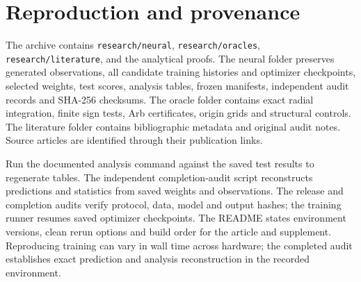 \documentclass[10 pt,a 4 paper]{article}
\begin{document}
\section{Reproduction and provenance}
The archive contains \texttt{research/neural}, \texttt{research/oracles}, \texttt{research/literature}, and the analytical proofs. The neural folder preserves generated observations, all candidate training histories and optimizer checkpoints, selected weights, test scores, analysis tables, frozen manifests, independent audit records and SHA-256 checksums. The oracle folder contains exact radial integration, finite sign tests, Arb certificates, origin grids and structural controls. The literature folder contains bibliographic metadata and original audit notes. Source articles are identified through their publication links.

Run the documented analysis command against the saved test results to regenerate tables. The independent completion-audit script reconstructs predictions and statistics from saved weights and observations. The release and completion audits verify protocol, data, model and output hashes; the training runner resumes saved optimizer checkpoints. The README states environment versions, clean rerun options and build order for the article and supplement. Reproducing training can vary in wall time across hardware; the completed audit establishes exact prediction and analysis reconstruction in the recorded environment.


\end{document}
